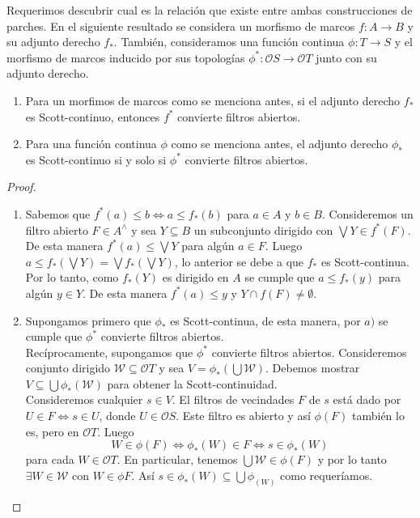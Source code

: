 Requerimos descubrir cual es la relación que existe entre ambas construcciones de parches. En el siguiente resultado se considera un morfismo de marcos $f\colon A\to B$ y su adjunto derecho $f_*$. También, consideramos una función continua $\phi\colon T\to S$ y el morfismo de marcos inducido por sus topologías $\phi^*\colon\mathcal{O}S\to \mathcal{O}T$ junto con su adjunto derecho.\\

\begin{thm}\label{Teorema7.2.4}
    \begin{enumerate}
        \item Para un morfimos de marcos como se menciona antes, si el adjunto derecho $f_*$ es Scott-continuo, entonces $f^*$ convierte filtros abiertos.
        \item Para una función continua $\phi$ como se menciona antes, el adjunto derecho $\phi_*$ es Scott-continuo si y solo si $\phi^*$ convierte filtros abiertos.
    \end{enumerate}
\end{thm}

\begin{proof}
    \begin{enumerate}
        \item Sabemos que $f^*(a)\leq b\Leftrightarrow a\leq f_*(b)$ para $a\in A$ y $b\in B$. Consideremos un filtro abierto $F\in A^\wedge$ y sea $Y\subseteq B$ un subconjunto dirigido con $\bigvee Y\in f^*(F)$. De esta manera $f^*(a)\leq \bigvee Y$ para algún $a\in F$. Luego $a\leq f_*(\bigvee Y)=\bigvee f_*(\bigvee Y)$, lo anterior se debe a que $f_*$ es Scott-continua.\\

        Por lo tanto, como $f_*(Y)$ es dirigido en $A$ se cumple que $a\leq f_*(y)$ para algún $y\in Y$. De esta manera $f^*(a)\leq y$ y $Y\cap f(F)\neq \emptyset$.

        \item Supongamos primero que $\phi_*$ es Scott-continua, de esta manera, por $a)$ se cumple que $\phi^*$ convierte filtros abiertos.\\

        Recíprocamente, supongamos que $\phi^*$ convierte filtros abiertos. Consideremos conjunto dirigido $\mathcal{W}\subseteq \mathcal{O}T$ y sea $V=\phi_*(\bigcup  \mathcal{W})$. Debemos mostrar $V\subseteq \bigcup \phi_*(\mathcal{W})$ para obtener la Scott-continuidad.\\

        Consideremos cualquier $s\in V$. El filtros de vecindades $F$ de $s$ está dado por $U\in F\Leftrightarrow s\in U$, donde $U\in \mathcal{O}S$. Este filtro es abierto y así $\phi(F)$ también lo es, pero en $\mathcal{O}T$. Luego
        \[
        W\in \phi(F)\Leftrightarrow \phi_*(W)\in F\Leftrightarrow s\in \phi_*(W)
        \]
        para cada $W\in \mathcal{O}T$. En particular, tenemos $\bigcup \mathcal{W}\in \phi(F)$ y por lo tanto $\exists W\in \mathcal{W}$ con $W\in \phi F$. Así $s\in \phi_*(W)\subseteq \bigcup \phi_(W)$ como requeríamos. 
    \end{enumerate}
\end{proof}

